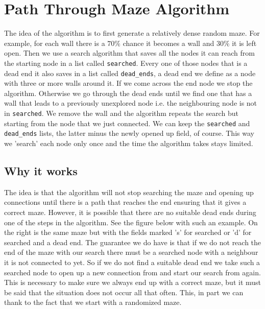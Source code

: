 \documentclass[10pt, a4paper, twoside]{amsart}
\newcommand{\1}{\mathbbm{1}}
\begin{document}
\section{Path Through Maze Algorithm}
The idea of the algorithm is to first generate a relatively dense random maze. For example, for each wall there is a $70\%$ chance it becomes a wall and $30\%$ it is left open. Then we use a search algorithm that saves all the nodes it can reach from the starting node in a list called \verb+searched+. Every one of those nodes that is a dead end it also saves in a list called \verb+dead_ends+, a dead end we define as a node with three or more walls around it. If we come across the end node we stop the algorithm. Otherwise we go through the dead ends until we find one that has a wall that leads to a previously unexplored node i.e. the neighbouring node is not in \verb+searched+. We remove the wall and the algorithm repeats the search but starting from the node that we just connected. We can keep the \verb+searched+ and \verb+dead_ends+ lists, the latter minus the newly opened up field, of course. This way we 'search' each node only once and the time the algorithm takes stays limited.

\subsection{Why it works}
The idea is that the algorithm will not stop searching the maze and opening up connections until there is a path that reaches the end ensuring that it gives a correct maze. However, it is possible that there are no suitable dead ends during one of the steps in the algorithm. See the figure below with such an example. On the right is the same maze but with the fields marked 's' for searched or 'd' for searched and a dead end. The guarantee we do have is that if we do not reach the end of the maze with our search there must be a searched node with a neighbour it is not connected to yet. So if we do not find a suitable dead end we take such a searched node to open up a new connection from and start our search from again.
This is necessary to make sure we always end up with a correct maze, but it must be said that the situation does not occur all that often. This, in part we can thank to the fact that we start with a randomized maze.
\end{document}
